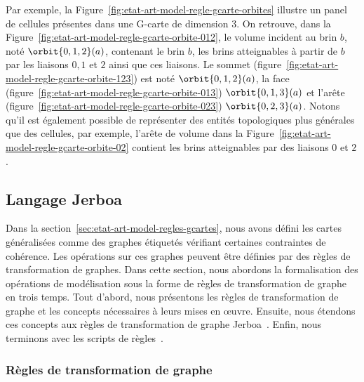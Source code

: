 Par exemple, la Figure~\ref{fig:etat-art-model-regle-gcarte-orbites} illustre un
panel de cellules présentes dans une G-carte de dimension $3$. %
On retrouve, dans la Figure~\ref{fig:etat-art-model-regle-gcarte-orbite-012}, le
volume incident au brin $b$, noté $\orbit{0,1,2}(a)$, contenant le brin $b$, les
brins atteignables à partir de $b$ par les liaisons $0,1$ et $2$ ainsi que ces
liaisons. %
Le sommet (figure~\ref{fig:etat-art-model-regle-gcarte-orbite-123}) est noté
$\orbit{0,1,2}(a)$, la face
(figure~\ref{fig:etat-art-model-regle-gcarte-orbite-013}) $\orbit{0,1,3}(a)$ et
l'arête (figure~\ref{fig:etat-art-model-regle-gcarte-orbite-023})
$\orbit{0,2,3}(a)$. %
Notons qu'il est également possible de représenter des entités topologiques plus
générales que des cellules, par exemple, l'arête de volume dans la
Figure~\ref{fig:etat-art-model-regle-gcarte-orbite-02} contient les brins
atteignables par des liaisons $0$ et $2$. %

\subsection[Langage Jerboa]{Langage Jerboa}
\label{sec:etat-art-model-regles-lang-jerboa}


Dans la section~\ref{sec:etat-art-model-regles-gcartes}, nous avons défini les
cartes généralisées comme des graphes étiquetés vérifiant certaines
contraintes de cohérence. %
Les opérations sur ces graphes peuvent être définies par des règles de
transformation de graphes. %
Dans cette section, nous abordons la formalisation des opérations de
modélisation sous la forme de règles de transformation de graphe en trois
temps. %
Tout d'abord, nous présentons les règles de transformation de graphe et les
concepts nécessaires à leurs mises en \oe uvre. %
Ensuite, nous étendons ces concepts aux règles de transformation de graphe
Jerboa~\cite{belhaouari2014jerboa,arnould2022preserving,pascual2022topological}. %
Enfin, nous terminons avec les scripts de règles~\cite{gauth2019}. %

\subsubsection[Règles de transformation de graphe]{Règles de transformation de graphe}
\label{sec:etat-art-model-regles-lang-jerboa-regles-inst}

